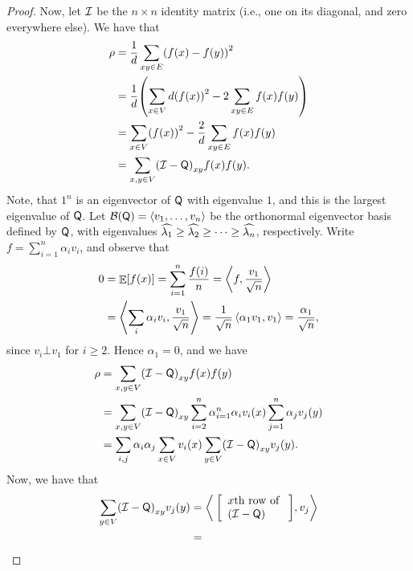 \begin{proof}
    Now, let $\mathcal{I}$ be the $n\times n$ identity matrix (i.e., one on
    its diagonal, and zero everywhere else). We have that
    \begin{align*}
        \rho & 
        = \frac{1}{d} \sum_{xy \in E}\pth{ f(x) -f(y) }^2
        \\ &=
        \frac{1}{d} \pth{ \sum_{x\in V} d \pth{f(x)}^2 -
           2\sum_{xy \in E}f(x) f(y) }
        \\ &=
        \sum_{x\in V} \pth{f(x)}^2 - \frac{2}{d} \sum_{xy \in E}f(x)
        f(y) 
        \\        &
        =
        \sum_{x,y \in V} \pth{\IMtrx - \TMtrx}_{xy} f(x) f(y).
    \end{align*}
    Note, that $1^n$ is an eigenvector of $\mathsf{Q}$ with eigenvalue
    $1$, and this is the largest eigenvalue of $\mathsf{Q}$.  Let
    $\mathcal{B}(\mathsf{Q})= \left\langle {v_1,\ldots, v_n} \right\rangle$ be the orthonormal
    eigenvector basis defined by $\mathsf{Q}$, with eigenvalues $\widehat{\lambda_{1}}
    \geq \widehat{\lambda_{2}} \geq \cdots \geq \widehat{\lambda_{n}}$, respectively.  Write
    $f=\sum_{i=1}^n \alpha_i v_i$, and observe that
    \begin{align*}
    0 &= \mathop{\mathbb{E}}\!\left[ {f(x)} \right] = \sum_{i=1}^n \frac{f(i)}{n} =
    \left\langle {{f},{\frac{v_1}{\sqrt{n}}}} \right\rangle
    \\
    &= \left\langle {{\sum_i \alpha_i v_i},{\frac{v_1}{\sqrt{n}}}} \right\rangle =
    \frac{1}{\sqrt{n}} \left\langle {{\alpha_1v_1},{v_1}} \right\rangle =
    \frac{\alpha_1}{\sqrt{n}},
    \end{align*}
    since $v_i \bot v_1$ for $i \geq 2$. Hence $\alpha_1=0$, and we
    have
    \begin{align*}
        \rho &=  \sum_{x,y \in V} \pth{\IMtrx - \TMtrx}_{xy} f(x) f(y)
        \\ &= \sum_{x,y \in V} \pth{\IMtrx - \TMtrx}_{xy}\sum_{i=2}^n
        \alpha_{i=1}^n \alpha_i v_i (x) \sum_{j=1}^n \alpha_j v_j(y)\\
        &%
        =%
        \sum_{i,j} \alpha_i \alpha_j \sum_{x \in V} v_i(x) \sum_{y \in
           V} \pth{\IMtrx - \TMtrx}_{xy} v_j(y).
    \end{align*}
    Now, we have that
    \begin{align*}
        \sum_{y \in V} \pth{\IMtrx - \TMtrx}_{xy} v_j(y) &=
        \DotProd{\;\;\pbrc{\begin{array}{l}
                  x\text{th row of }\\
                  \pth{\IMtrx - \TMtrx}
               \end{array}}}{v_j}
        \\&=%

\end{align*}
\end{proof}
